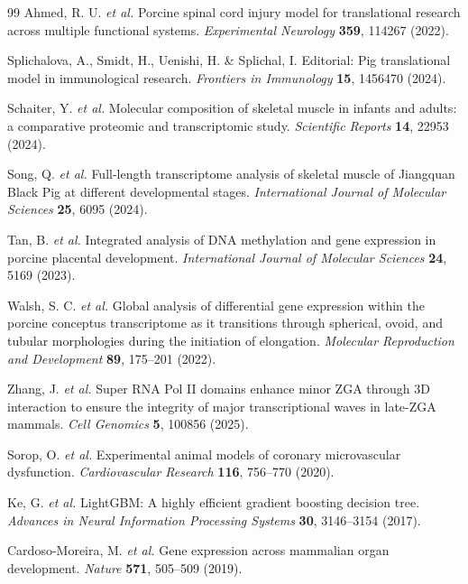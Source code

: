 \begin{thebibliography}{99}
 Ahmed, R. U. \textit{et al.} Porcine spinal cord injury model for translational research across multiple functional systems. \textit{Experimental Neurology} \textbf{359}, 114267 (2022).

 Splichalova, A., Smidt, H., Uenishi, H. \& Splichal, I. Editorial: Pig translational model in immunological research. \textit{Frontiers in Immunology} \textbf{15}, 1456470 (2024).

 Schaiter, Y. \textit{et al.} Molecular composition of skeletal muscle in infants and adults: a comparative proteomic and transcriptomic study. \textit{Scientific Reports} \textbf{14}, 22953 (2024).

 Song, Q. \textit{et al.} Full-length transcriptome analysis of skeletal muscle of Jiangquan Black Pig at different developmental stages. \textit{International Journal of Molecular Sciences} \textbf{25}, 6095 (2024).

 Tan, B. \textit{et al.} Integrated analysis of DNA methylation and gene expression in porcine placental development. \textit{International Journal of Molecular Sciences} \textbf{24}, 5169 (2023).

 Walsh, S. C. \textit{et al.} Global analysis of differential gene expression within the porcine conceptus transcriptome as it transitions through spherical, ovoid, and tubular morphologies during the initiation of elongation. \textit{Molecular Reproduction and Development} \textbf{89}, 175--201 (2022).

 Zhang, J. \textit{et al.} Super RNA Pol II domains enhance minor ZGA through 3D interaction to ensure the integrity of major transcriptional waves in late-ZGA mammals. \textit{Cell Genomics} \textbf{5}, 100856 (2025).

 Sorop, O. \textit{et al.} Experimental animal models of coronary microvascular dysfunction. \textit{Cardiovascular Research} \textbf{116}, 756--770 (2020).

 Ke, G. \textit{et al.} LightGBM: A highly efficient gradient boosting decision tree. \textit{Advances in Neural Information Processing Systems} \textbf{30}, 3146--3154 (2017).

 Cardoso-Moreira, M. \textit{et al.} Gene expression across mammalian organ development. \textit{Nature} \textbf{571}, 505--509 (2019).

\end{thebibliography}